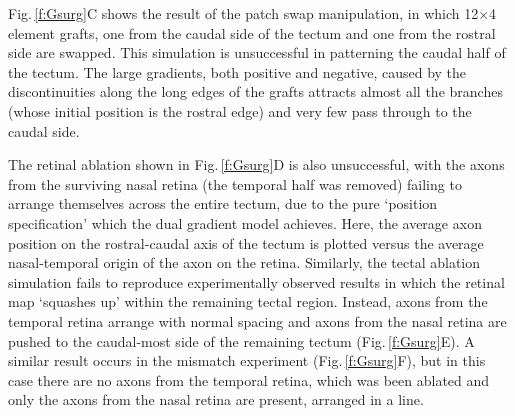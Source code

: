 \documentclass[11pt, a4paper, draft]{article}
\begin{document}
Fig.\,\ref{f:Gsurg}C shows the result of the patch swap manipulation, in
which 12$\times$4 element grafts, one from the caudal side of the tectum and one from
the rostral side are swapped. This simulation is unsuccessful in patterning
the caudal half of the tectum. The large gradients, both positive and
negative, caused by the discontinuities along the long edges of the grafts
attracts almost all the branches (whose initial position is the rostral edge)
and very few pass through to the caudal side.

The retinal ablation shown in Fig.\,\ref{f:Gsurg}D is also unsuccessful, with
the axons from the surviving nasal retina (the temporal half was removed)
failing to arrange themselves across the entire tectum, due to the pure
`position specification' which the dual gradient model achieves. Here, the
average axon position on the rostral-caudal axis of the tectum is plotted versus the average
nasal-temporal origin of the axon on the retina. Similarly,
the tectal ablation simulation fails to reproduce experimentally observed
results in which the retinal map `squashes up' within the remaining tectal
region. Instead, axons from the temporal retina arrange with normal spacing
and axons from the nasal retina are pushed to the caudal-most side of the
remaining tectum (Fig.\,\ref{f:Gsurg}E). A similar result occurs in the
mismatch experiment (Fig.\,\ref{f:Gsurg}F), but in this case there are no
axons from the temporal retina, which was been ablated and only the axons
from the nasal retina are present, arranged in a line.
\end{document}
